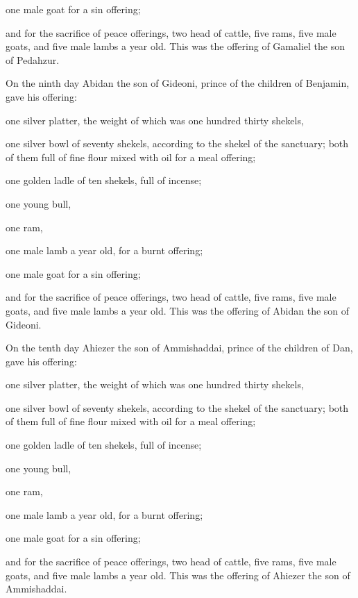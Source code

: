{\par }{\PP {}one male goat for a sin offering;
\par }{\PP {}and for the sacrifice of peace offerings, two head of cattle, five rams, five male goats, and five male lambs a year old. This was the offering of Gamaliel the son of Pedahzur.
\par }{\PP {}On the ninth day Abidan the son of Gideoni, prince of the children of Benjamin,
gave his offering:
\par }{\PP one silver platter, the weight of which was one hundred thirty shekels,
\par }{\PP one silver bowl of seventy shekels, according to the shekel of the sanctuary; both of them full of fine flour mixed with oil for a meal offering;
\par }{\PP {}one golden ladle of ten shekels, full of incense;
\par }{\PP {}one young bull,
\par }{\PP one ram,
\par }{\PP one male lamb a year old, for a burnt offering;
\par }{\PP {}one male goat for a sin offering;
\par }{\PP {}and for the sacrifice of peace offerings, two head of cattle, five rams, five male goats, and five male lambs a year old. This was the offering of Abidan the son of Gideoni.
\par }{\PP {}On the tenth day Ahiezer the son of Ammishaddai, prince of the children of Dan,
gave his offering:
\par }{\PP one silver platter, the weight of which was one hundred thirty shekels,
\par }{\PP one silver bowl of seventy shekels, according to the shekel of the sanctuary; both of them full of fine flour mixed with oil for a meal offering;
\par }{\PP {}one golden ladle of ten shekels, full of incense;
\par }{\PP {}one young bull,
\par }{\PP one ram,
\par }{\PP one male lamb a year old, for a burnt offering;
\par }{\PP {}one male goat for a sin offering;
\par }{\PP {}and for the sacrifice of peace offerings, two head of cattle, five rams, five male goats, and five male lambs a year old. This was the offering of Ahiezer the son of Ammishaddai.
}
